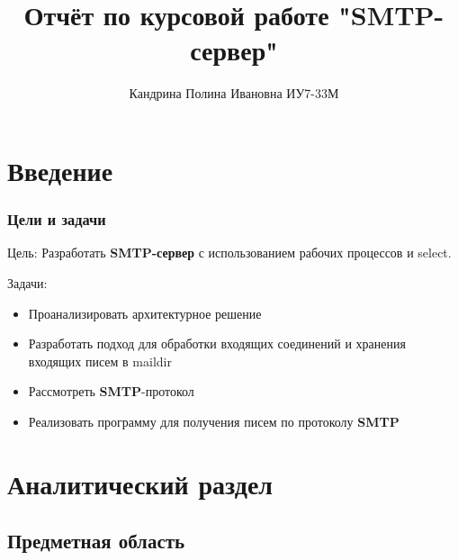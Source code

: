 \documentclass[a4paper,12pt]{report}
\title{Отчёт по курсовой работе "SMTP-сервер"}
\author{Кандрина Полина Ивановна ИУ7-33М}
\begin{document}
\maketitle

\tableofcontents

\chapter*{Введение}
\subsection{Цели и задачи}

Цель: 
    Разработать \textbf{SMTP-сервер} с использованием рабочих процессов и select.

Задачи:
\begin{itemize}
    \item Проанализировать архитектурное решение
    \item Разработать подход для обработки входящих соединений и хранения входящих писем в maildir
    \item Рассмотреть \textbf{SMTP}-протокол
    \item Реализовать программу для получения писем по протоколу \textbf{SMTP}
\end{itemize}

\chapter{Аналитический раздел}

\section*{Предметная область}
\end{document}
